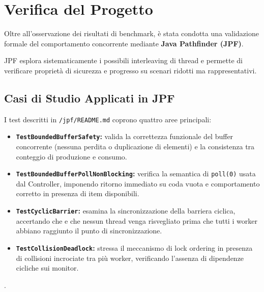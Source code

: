 \section{Verifica del Progetto}
Oltre all'osservazione dei risultati di benchmark, è stata condotta una validazione formale del comportamento concorrente mediante \textbf{Java Pathfinder (JPF)}.

JPF esplora sistematicamente i possibili interleaving di thread e permette di verificare proprietà di sicurezza e progresso su scenari ridotti ma rappresentativi.

\subsection{Casi di Studio Applicati in JPF}
\label{sec:verifica_formale}
I test descritti in \texttt{/jpf/README.md} coprono quattro aree principali:
\begin{itemize}
    \item \textbf{\texttt{TestBoundedBufferSafety}:} valida la correttezza funzionale del buffer concorrente (nessuna perdita o duplicazione di elementi) e la consistenza tra conteggio di produzione e consumo.
    
    \item \textbf{\texttt{TestBoundedBufferPollNonBlocking}:} verifica la semantica di \texttt{poll(0)} usata dal Controller, imponendo ritorno immediato su coda vuota e comportamento corretto in presenza di item disponibili.
    
    \item \textbf{\texttt{TestCyclicBarrier}:} esamina la sincronizzazione della barriera ciclica, accertando che e che nessun thread venga risvegliato prima che tutti i worker abbiano raggiunto il punto di sincronizzazione.

    \item \textbf{\texttt{TestCollisionDeadlock}:} stressa il meccanismo di lock ordering in presenza di collisioni incrociate tra più worker, verificando l'assenza di dipendenze cicliche sui monitor.
\end{itemize}.